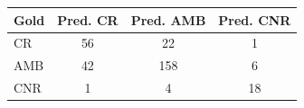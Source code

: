 \begin{tabular}{lccc}
\toprule
\textbf{Gold} & \textbf{Pred. CR} & \textbf{Pred. AMB} & \textbf{Pred. CNR} \\
\midrule
CR & 56 & 22 & 1 \\
AMB & 42 & 158 & 6 \\
CNR & 1 & 4 & 18 \\
\bottomrule
\end{tabular}
